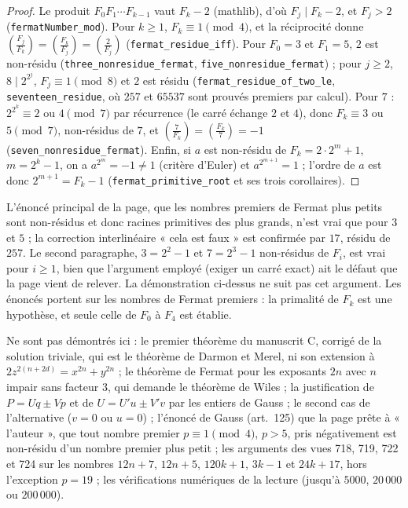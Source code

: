 \begin{proof}
Le produit $F_0 F_1 \cdots F_{k-1}$ vaut $F_k - 2$ (mathlib), d'où $F_j \mid F_k - 2$, et $F_j > 2$ (\texttt{fermatNumber\_mod}). Pour $k \geq 1$, $F_k \equiv 1 \pmod 4$, et la réciprocité donne $\left(\frac{F_j}{F_k}\right) = \left(\frac{F_k}{F_j}\right) = \left(\frac{2}{F_j}\right)$ (\texttt{fermat\_residue\_iff}). Pour $F_0 = 3$ et $F_1 = 5$, $2$ est non-résidu (\texttt{three\_nonresidue\_fermat}, \texttt{five\_nonresidue\_fermat}) ; pour $j \geq 2$, $8 \mid 2^{2^j}$, $F_j \equiv 1 \pmod 8$ et $2$ est résidu (\texttt{fermat\_residue\_of\_two\_le}, \texttt{seventeen\_residue}, où $257$ et $65537$ sont prouvés premiers par calcul). Pour $7$ : $2^{2^k} \equiv 2$ ou $4 \pmod 7$ par récurrence (le carré échange $2$ et $4$), donc $F_k \equiv 3$ ou $5 \pmod 7$, non-résidus de $7$, et $\left(\frac{7}{F_k}\right) = \left(\frac{F_k}{7}\right) = -1$ (\texttt{seven\_nonresidue\_fermat}). Enfin, si $a$ est non-résidu de $F_k = 2 \cdot 2^m + 1$, $m = 2^k - 1$, on a $a^{2^m} = -1 \neq 1$ (critère d'Euler) et $a^{2^{m+1}} = 1$ ; l'ordre de $a$ est donc $2^{m+1} = F_k - 1$ (\texttt{fermat\_primitive\_root} et ses trois corollaires).
\end{proof}

\begin{remarque}
L'énoncé principal de la page, que les nombres premiers de Fermat plus petits sont non-résidus et donc racines primitives des plus grands, n'est vrai que pour $3$ et $5$ ; la correction interlinéaire « cela est faux » est confirmée par $17$, résidu de $257$. Le second paragraphe, $3 = 2^2 - 1$ et $7 = 2^3 - 1$ non-résidus de $F_i$, est vrai pour $i \geq 1$, bien que l'argument employé (exiger un carré exact) ait le défaut que la page vient de relever. La démonstration ci-dessus ne suit pas cet argument. Les énoncés portent sur les nombres de Fermat premiers : la primalité de $F_k$ est une hypothèse, et seule celle de $F_0$ à $F_4$ est établie.
\end{remarque}

Ne sont pas démontrés ici : le premier théorème du manuscrit C, corrigé de la solution triviale, qui est le théorème de Darmon et Merel, ni son extension à $2z^{2(n+2d)} = x^{2n} + y^{2n}$ ; le théorème de Fermat pour les exposants $2n$ avec $n$ impair sans facteur $3$, qui demande le théorème de Wiles ; la justification de $P = Uq \pm Vp$ et de $U = U'u \pm V'v$ par les entiers de Gauss ; le second cas de l'alternative ($v = 0$ ou $u = 0$) ; l'énoncé de Gauss (art.~125) que la page prête à « l'auteur », que tout nombre premier $p \equiv 1 \pmod 4$, $p > 5$, pris négativement est non-résidu d'un nombre premier plus petit ; les arguments des vues 718, 719, 722 et 724 sur les nombres $12n+7$, $12n+5$, $120k+1$, $3k-1$ et $24k+17$, hors l'exception $p = 19$ ; les vérifications numériques de la lecture (jusqu'à $5000$, $20\,000$ ou $200\,000$).

